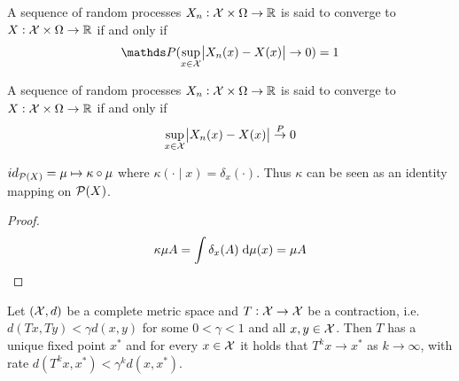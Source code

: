 \begin{defn}
  A sequence of random processes $X_n : \mathcal{X} \times \Omega \to \mathbb{R}$
  is said to converge  to $X: \mathcal{X} \times \Omega \to \mathbb{R}$ if and only if
  \[ \Prob(\sup_{x \in \Cal{X}} \abs{X_n(x) - X(x)} \to 0) = 1 \]
\end{defn}

\begin{defn} 
  A sequence of random processes $X_n: \mathcal{X} \times \Omega \to \mathbb{R}$
  is said to converge  to $X : \mathcal{X} \times \Omega \to \mathbb{R}$ if and only if
  \[ \sup_{x \in \mathcal{X}} \abs{X_n(x) - X(x)} \overset{P}{\to} 0 \]
\end{defn}

\begin{prop}
  $id_{\mathcal{P}(X)} = \mu \mapsto \kappa \circ \mu$
  where $\kappa(\cdot \mid x) = \delta_x(\cdot)$.
  Thus $\kappa$ can be seen as an identity mapping on $\mathcal{P}(X)$.
  \label{prop:identityKernel}
\end{prop}
\begin{proof}
  \[ \kappa \mu A = \int \delta_x(A) \; \mathrm{d} \mu(x) = \mu A \]
\end{proof}


\begin{thm}
  Let $(\mathcal{X}, d)$ be a complete metric space
  and $T:\mathcal{X} \to \mathcal{X}$ be a contraction,
  i.e. $d(Tx, Ty)<\gamma d(x, y)$ for some $0 < \gamma < 1$
  and all $x,y \in \mathcal{X}$.
  Then $T$ has a unique fixed point $x^*$ and for every $x\in \mathcal{X}$
  it holds that $T^k x \to x^*$ as $k \to \infty$, with rate
  $d(T^k x, x^*) < \gamma^k d(x, x^*)$.
  \label{thm:BanachFP}
\end{thm}



